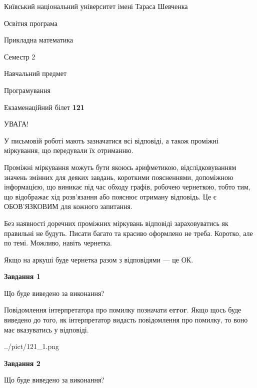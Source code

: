 \documentclass[12pt, ukrainian]{article}
\begin{document}
{{\begin {small}\par
{ \center  Київський національний університет імені Тараса Шевченка \par}
{\parbox {5 cm}{Освітня програма \hfill}{\parbox {7 cm}{Прикладна математика \hfill}}\parbox {6 cm}{\hfill Семестр 2}}\par
{\parbox {5 cm} {Навчальний предмет \hfill}\parbox {7 cm}{Програмування \hfill}\parbox {6cm}{\hfill}\par}\vspace{-7pt} \end{small}}{\center Екзаменаційний білет \No \textbf
{ 121 }\par}}
{
\begin {large}
УВАГА!

У письмовій роботі мають зазначатися всі відповіді, а також проміжні міркування, що передували їх отриманню.

Проміжні міркування можуть бути якоюсь арифметикою, відслідковуванням зна\-чень змінних для деяких завдань,
короткими поясненнями, допоміжною інформацією, що виникає під час обходу графів, робочею чернеткою,
тобто тим, що відображає хід розв’язання або пояснює отриману відповідь.
Це є ОБОВ’ЯЗКОВИМ для кожного запитання.

Без наявності доречних проміжних міркувань відповіді зараховуватись як правиль\-ні не будуть.
Писати багато та красиво оформлено не треба. Коротко, але по темі. Можли\-во, навіть чернетка.

Якщо на аркуші буде чернетка разом з відповідями --- це ОК.

\newpage

{\begin {center}\textbf{Завдання 1}\end {center}}\par
Що буде виведено за виконання?

Повідомлення інтерпретатора про помилку позначати \textbf{error}.
Якщо щось буде виведено до того, як інтерпретатор видасть повідомлення про помилку, 
то воно має вказуватись у відповіді. \par


\begin{center}
	{../pict/121_1.png}
\end{center}
\newpage

{\begin {center}\textbf{Завдання 2}\end {center}}\par
Що буде виведено за виконання?


\end{large}}
\end{document}
